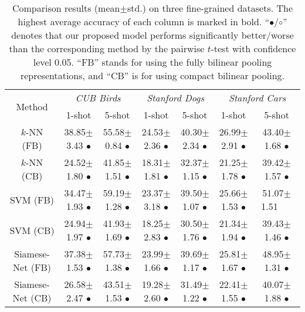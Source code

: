 \documentclass[10pt,twocolumn,letterpaper]{article}
\begin{document}
\begin{table*}[t]
 \caption{Comparison results (mean$\pm$std.) on three fine-grained datasets. The highest average accuracy of each column is marked in bold. ``$\bullet$/$\circ$'' denotes that our proposed model performs significantly better/worse than the corresponding method by the pairwise $t$-test with confidence level 0.05. ``FB'' stands for using the fully bilinear pooling representations, and ``CB'' is for using compact bilinear pooling.} \label{table:result}
 \centering
 \small
 \begin{tabular}{|c|c|c|c|c|c|c|}
  \hline
  \multirow{2}{*}{Method} & \multicolumn{2}{c|}{\textit{CUB Birds}} & \multicolumn{2}{c|}{\textit{Stanford Dogs}} & \multicolumn{2}{c|}{\textit{Stanford Cars}} \\
  \cline{2-7} & 1-shot & 5-shot & 1-shot & 5-shot & 1-shot & 5-shot  \\
  \hline
  \hline
  $k$-NN (FB) &  38.85{\scriptsize$\pm$3.43} $\bullet$  &  55.58{\scriptsize$\pm$0.84} $\bullet$   &  24.53{\scriptsize$\pm$2.36} $\bullet$   &  40.30{\scriptsize$\pm$2.34} $\bullet$   &  26.99{\scriptsize$\pm$2.91} $\bullet$  &  43.40{\scriptsize$\pm$1.68} $\bullet$   \\
  $k$-NN (CB) &  24.52{\scriptsize$\pm$1.80} $\bullet$ & 41.85{\scriptsize$\pm$1.51} $\bullet$ &  18.31{\scriptsize$\pm$1.81} $\bullet$ & 32.37{\scriptsize$\pm$1.15} $\bullet$   & 21.25{\scriptsize$\pm$1.78} $\bullet$   &   39.42{\scriptsize$\pm$1.57} $\bullet$  \\
  SVM (FB) &  34.47{\scriptsize$\pm$1.93} $\bullet$  &  59.19{\scriptsize$\pm$1.28} $\bullet$  &  23.37{\scriptsize$\pm$3.18} $\bullet$  &  39.50{\scriptsize$\pm$1.07} $\bullet$  & 25.66{\scriptsize$\pm$1.53} $\bullet$   &  51.07{\scriptsize$\pm$1.51}~~~   \\
  SVM (CB) & 24.94{\scriptsize$\pm$1.97} $\bullet$   & 41.93{\scriptsize$\pm$1.69} $\bullet$   &  18.25{\scriptsize$\pm$2.83} $\bullet$  &  30.50{\scriptsize$\pm$1.76} $\bullet$  &  21.34{\scriptsize$\pm$1.94} $\bullet$  &   39.43{\scriptsize$\pm$1.46} $\bullet$  \\
  Siamese-Net (FB) &    37.38{\scriptsize$\pm$1.53} $\bullet$  &  57.73{\scriptsize$\pm$1.38} $\bullet$  &  23.99{\scriptsize$\pm$1.66} $\bullet$  &  39.69{\scriptsize$\pm$1.17} $\bullet$  & 25.81{\scriptsize$\pm$1.67} $\bullet$   &  48.95{\scriptsize$\pm$1.31} $\bullet$  \\
  Siamese-Net (CB) &    26.58{\scriptsize$\pm$2.47} $\bullet$  &  43.51{\scriptsize$\pm$1.53} $\bullet$  &  19.28{\scriptsize$\pm$2.60} $\bullet$  &  31.49{\scriptsize$\pm$1.22} $\bullet$  & 22.41{\scriptsize$\pm$1.55} $\bullet$   &  40.07{\scriptsize$\pm$1.88} $\bullet$   \\

\end{tabular}
\end{table*}
\end{document}
